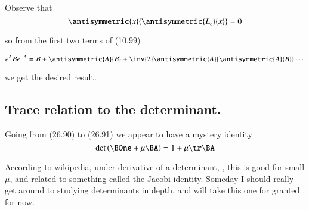 Observe that 
\begin{equation}\label{eqn:desaiCh26:110}
\antisymmetric{x}{\antisymmetric{L_z}{x}} = 0
\end{equation}

so from the first two terms of (10.99) 

\begin{equation}\label{eqn:desaiCh26:120}
e^{A} B e^{-A}
= B + \antisymmetric{A}{B}
+\inv{2} \antisymmetric{A}{\antisymmetric{A}{B}} \cdots
\end{equation}

we get the desired result.

\subsection{Trace relation to the determinant.}

Going from (26.90) to (26.91) we appear to have a mystery identity
\begin{equation}\label{eqn:desaiCh26:130}
\det \left( \BOne + \mu \BA \right) = 1 + \mu \tr \BA
\end{equation}

According to wikipedia, under derivative of a determinant, \citep{wiki:determinant}, this is good for small $\mu$, and related to something called the Jacobi identity.  Someday I should really get around to studying determinants in depth, and will take this one for granted for now.

\EndArticle
